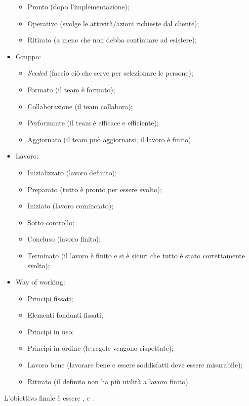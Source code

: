 \documentclass[../main]{subfiles}
\begin{document}
\begin{itemize}
\begin{itemize}
        \item Pronto (dopo l'implementazione);
        \item Operativo (svolge le attività/azioni richieste dal cliente);
        \item Ritirato (a meno che non debba continuare ad esistere);
    \end{itemize}
    \item Gruppo:
    \begin{itemize}
        \item \textit{Seeded} (faccio ciò che serve per selezionare le persone);
        \item Formato (il team è formato);
        \item Collaborazione (il team collabora);
        \item Performante (il team è efficace e efficiente);
        \item Aggiornato (il team può aggiornarsi, il lavoro è finito).
    \end{itemize}
    \item Lavoro:
    \begin{itemize}
        \item Inizializzato (lavoro definito);
        \item Preparato (tutto è pronto per essere svolto);
        \item Iniziato (lavoro cominciato);
        \item Sotto controllo;
        \item Concluso (lavoro finito);
        \item Terminato (il lavoro è finito e si è sicuri che tutto è stato correttamente svolto);
    \end{itemize}
    \item Way of working:
    \begin{itemize}
        \item Principi fissati;
        \item Elementi fondanti fissati;
        \item Principi in uso;
        \item Principi in ordine (le regole vengono rispettate);
        \item Lavoro bene (lavorare bene e essere soddisfatti deve essere misurabile);
        \item Ritirato (il  definito non ha più utilità a lavoro finito).
    \end{itemize}
\end{itemize}
L'obiettivo finale è essere ,  e .
\end{document}
